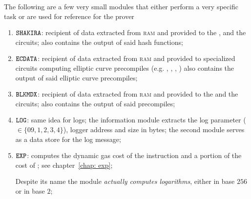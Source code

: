 The following are a few very small modules that either perform a very specific task or are used for reference for the prover
\begin{enumerate}[resume]
	\item $\texttt{SHAKIRA}$:
		recipient of data extracted from \textsc{ram} and provided to the
		,
		\instShaTwo{} and the
		\instRipemd{} circuits;
		also contains the output of said hash functions;
	\item $\texttt{ECDATA}$:
		recipient of data extracted from \textsc{ram} and provided to specialized circuits computing elliptic curve precompiles
		(e.g.
		\instEcrecover{},
		\instEcadd{},
		\instEcmul{},
		\instEcpairing{})
		also contains the output of said elliptic curve precompiles;
	\item $\texttt{BLKMDX}$:
		recipient of data extracted from \textsc{ram} and provided to the
		\instModexp{} and the
		\instBlake{} circuits;
		also contains the output of said precompiles;
	\item $\texttt{LOG}{}$:
		same idea for logs;
		the information module extracts the log parameter ($\in\{09,1,2,3,4\}$), logger address and size in bytes;
		the second module serves as a data store for the log message;
	\item $\texttt{EXP}{}$:
		computes the dynamic gas cost of the  instruction and a portion of the cost of \instModexp{};
		see chapter~\ref{chap: exp};

		\saNote{} Despite its name the \expMod{} module \emph{actually computes logarithms}, either in base $256$ or in base $2$;
\end{enumerate}

